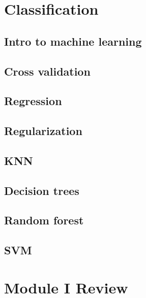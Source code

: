 \documentclass[]{book}
\begin{document}
\hypertarget{ml}{%
\chapter{Classification}\label{ml}}

\hypertarget{intro-to-machine-learning}{%
\section{Intro to machine learning}\label{intro-to-machine-learning}}

\hypertarget{cross-validation}{%
\section{Cross validation}\label{cross-validation}}

\hypertarget{regression}{%
\section{Regression}\label{regression}}

\hypertarget{regularization}{%
\section{Regularization}\label{regularization}}

\hypertarget{knn}{%
\section{KNN}\label{knn}}

\hypertarget{decision-trees}{%
\section{Decision trees}\label{decision-trees}}

\hypertarget{random-forest}{%
\section{Random forest}\label{random-forest}}

\hypertarget{svm}{%
\section{SVM}\label{svm}}

\hypertarget{m1re}{%
\chapter{Module I Review}\label{m1re}}
\end{document}
